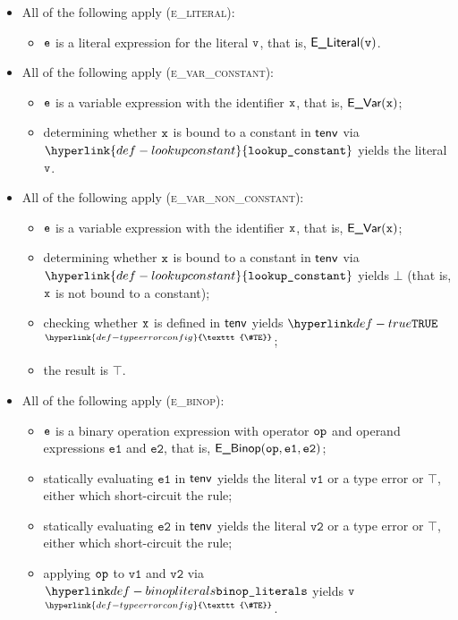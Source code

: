 \documentclass{book}
\newcommand\TypeErrorConfig[0]{\hyperlink{def-typeerrorconfig}{\texttt{\#TE}}}
\newcommand\ProseOrTypeError[0]{\hyperlink{def-proseortypeerror}{$^{\TypeErrorConfig}$}}
\newcommand\lookupconstant[0]{\hyperlink{def-lookupconstant}{\texttt{lookup\_constant}}}
\newcommand\UnsupportedExpression[0]{\top}
\newcommand\vvone[0]{\texttt{v1}}
\newcommand\vvtwo[0]{\texttt{v2}}
\newcommand\veone[0]{\texttt{e1}}
\newcommand\vetwo[0]{\texttt{e2}}
\begin{document}
\begin{itemize}
  \item All of the following apply (\textsc{e\_literal}):
  \begin{itemize}
    \item $\texttt{e}$ is a literal expression for the literal $\texttt{v}$, that is, $\textsf{E\_Literal}(\texttt{v})$.
  \end{itemize}

  \item All of the following apply (\textsc{e\_var\_constant}):
  \begin{itemize}
    \item $\texttt{e}$ is a variable expression with the identifier $\texttt{x}$, that is, $\textsf{E\_Var}(\texttt{x})$;
    \item determining whether $\texttt{x}$ is bound to a constant in $\textsf{tenv}$ via $\lookupconstant$ yields the literal $\texttt{v}$.
  \end{itemize}

  \item All of the following apply (\textsc{e\_var\_non\_constant}):
  \begin{itemize}
    \item $\texttt{e}$ is a variable expression with the identifier $\texttt{x}$, that is, $\textsf{E\_Var}(\texttt{x})$;
    \item determining whether $\texttt{x}$ is bound to a constant in $\textsf{tenv}$ via $\lookupconstant$ yields $\bot$
          (that is, $\texttt{x}$ is not bound to a constant);
    \item checking whether $\texttt{x}$ is defined in $\textsf{tenv}$ yields $\True$ \ProseOrTypeError;
    \item the result is $\UnsupportedExpression$.
  \end{itemize}

  \item All of the following apply (\textsc{e\_binop}):
  \begin{itemize}
    \item $\texttt{e}$ is a binary operation expression with operator $\texttt{op}$ and operand expressions $\veone$ and $\vetwo$,
          that is, $\EBinop(\op, \veone, \vetwo)$;
    \item statically evaluating $\veone$ in $\textsf{tenv}$ yields the literal $\vvone$ or a type error or $\UnsupportedExpression$,
          either which short-circuit the rule;
    \item statically evaluating $\vetwo$ in $\textsf{tenv}$ yields the literal $\vvtwo$ or a type error or $\UnsupportedExpression$,
          either which short-circuit the rule;
    \item applying $\texttt{op}$ to $\vvone$ and $\vvtwo$ via $\binopliterals$ yields $\texttt{v}$ \ProseOrTypeError.
  \end{itemize}


\end{itemize}
\end{document}
